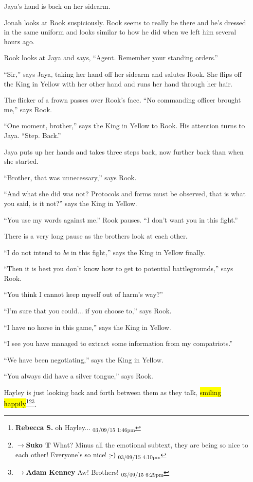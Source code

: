 Jaya's hand is back on her sidearm.

Jonah looks at Rook suspiciously. Rook seems to really be there and he's dressed in the same uniform and looks similar to how he did when we left him several hours ago.



Rook looks at Jaya and says, ``Agent.  Remember your standing orders.''

``Sir,'' says Jaya, taking her hand off her sidearm and salutes Rook. She flips off the King in Yellow with her other hand and runs her hand through her hair.

The flicker of a frown passes over Rook's face. ``No commanding officer brought me,'' says Rook.

``One moment, brother,'' says the King in Yellow to Rook.  His attention turns to Jaya.  ``Step.  Back.''

Jaya puts up her hands and takes three steps back, now further back than when she started.

``Brother, that was unnecessary,'' says Rook.

``And what she did was not?  Protocols and forms must be observed, that is what you said, is it not?'' says the King in Yellow.

``You use my words against me.''  Rook pauses.  ``I don't want you in this fight.''

There is a very long pause as the brothers look at each other.

``I do not intend to \textit{be} in this fight,'' says the King in Yellow finally.

``Then it is best you don't know how to get to potential battlegrounds,'' says Rook.

``You think I cannot keep myself out of harm's way?''

``I'm sure that you could... if you choose to,'' says Rook.

``I have no horse in this game,'' says the King in Yellow.

``I see you have managed to extract some information from my compatriots.''

``We have been negotiating,'' says the King in Yellow.

``You always did have a silver tongue,'' says Rook.

Hayley is just looking back and forth between them as they talk, \hl{smiling happily}\footnote{\textbf{Rebecca S. }oh Hayley... \textsubscript{03/09/15 1:46pm}}\footnote{$\rightarrow$\textbf{Suko T }What?  Minus all the emotional subtext, they are being so nice to each other!  Everyone's so nice! ;-) \textsubscript{03/09/15 4:10pm}}\footnote{$\rightarrow$\textbf{Adam Kenney }Aw! Brothers! \textsubscript{03/09/15 6:29pm}}.


